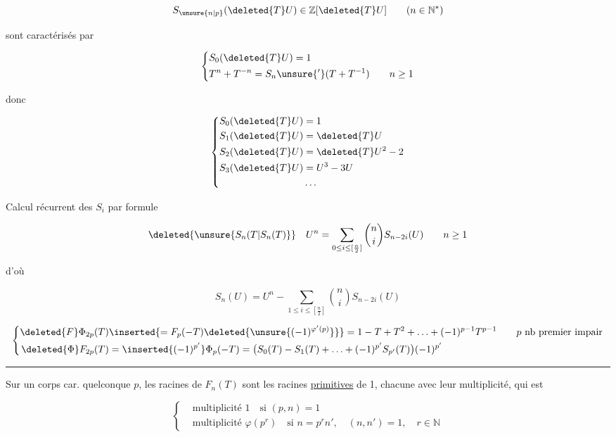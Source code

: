 \[
S_{\unsure{n|p}}(\deleted{T}U)\in\mathbb Z[\deleted{T}U]\qquad(n\in\mathbb N^*)
\]

sont caractérisés par

\[
\left\{\begin{aligned}
&S_0(\deleted{T}U)=1\\
&T^n+T^{-n}=S_n\unsure{'}(T+T^{-1})\qquad n\geq1
\end{aligned}\right.
\]

donc

\[
\left\{\begin{aligned}
S_0(\deleted{T}U)&=1\\
S_1(\deleted{T}U)&=\deleted{T}U\\
S_2(\deleted{T}U)&=\deleted{T}U^2-2\\
S_3(\deleted{T}U)&=U^3-3U\\
&\ldots
\end{aligned}\right.
\]

Calcul récurrent des $S_i$ par formule

\[
\deleted{\unsure{S_n(T|S_n(T)}}\quad U^n=\sum_{0\leq i\leq[\frac n2]}\binom ni S_{n-2i}(U)\qquad n\geq1
\]

d'où

\[
S_n(U)=U^n-\sum_{1\leq i\leq[\frac n2]}\binom ni S_{n-2i}(U)
\]



\[
\left\{\begin{aligned}
\deleted{F}\Phi_{2p}(T)&\inserted{=F_p(-T)\deleted{\unsure{(-1)^{\varphi'(p)}}}}
=1-T+T^2+\ldots+(-1)^{p-1}T^{p-1}\qquad\text{$p$ nb premier impair}\\
\deleted{\Phi}F_{2p}(T)&=\inserted{(-1)^{p'}}\Phi_p(-T)
=\bigl(S_0(T)-S_1(T)+\ldots+(-1)^{p'}S_{p'}(T)\bigr)(-1)^{p'}
\end{aligned}\right.
\]

\begin{center}\rule{1cm}{.4pt}\end{center}

Sur un corps  car. quelconque $p$, les racines de $F_n(T)$ sont les racines \uline{primitives}   de 1, chacune avec leur multiplicité, qui est

\[
\left\{\begin{aligned}
&\text{multiplicité }1\quad\text{si }(p,n)=1\\
&\text{multiplicité }\varphi(p^r)\quad\text{si }n=p^rn',\quad(n,n')=1,\quad r\in\mathbb N
\end{aligned}\right.
\]

